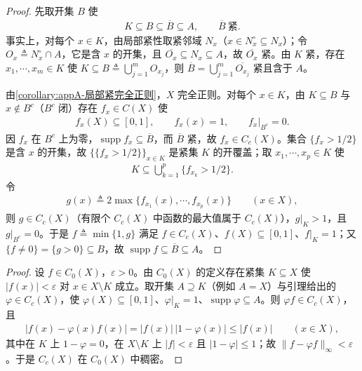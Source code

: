 \documentclass[../main.tex]{subfiles}
\begin{document}
\begin{proof}
先取开集 $B$ 使
\begin{align*}
K\subseteq B\subseteq\overline B\subseteq A,\qquad \overline B\ \text{紧}.
\end{align*}
事实上，对每个 $x\in K$，由局部紧性取紧邻域 $N_x$（$x\in N_x^\circ\subseteq N_x$）；令 $O_x\triangleq N_x^\circ\cap A$，它是含 $x$ 的开集，且 $\overline{O_x}\subseteq N_x\subseteq A$，故 $\overline{O_x}$ 紧。由 $K$ 紧，存在 $x_1,\cdots ,x_m\in K$ 使 $K\subseteq B\triangleq\bigcup_{j=1}^mO_{x_j}$，则 $\overline B=\bigcup_{j=1}^m\overline{O_{x_j}}$ 紧且含于 $A$。

由\cref{corollary:appA-局部紧完全正则}，$X$ 完全正则。对每个 $x\in K$，由 $K\subseteq B$ 与 $x\notin B^c$（$B^c$ 闭）存在 $f_x\in C(X)$ 使
\begin{align*}
f_x(X)\subseteq[0,1],\qquad f_x(x)=1,\qquad f_x|_{B^c}=0.
\end{align*}
因 $f_x$ 在 $B^c$ 上为零，$\operatorname{supp}f_x\subseteq\overline B$，而 $\overline B$ 紧，故 $f_x\in C_c(X)$。集合 $\{f_x>1/2\}$ 是含 $x$ 的开集，故 $\{\{f_x>1/2\}\}_{x\in K}$ 是紧集 $K$ 的开覆盖；取 $x_1,\cdots ,x_p\in K$ 使
\begin{align*}
K\subseteq\bigcup_{k=1}^p\{f_{x_k}>1/2\}.
\end{align*}
令
\begin{align*}
g(x)\triangleq2\max\{f_{x_1}(x),\cdots ,f_{x_p}(x)\}\qquad(x\in X),
\end{align*}
则 $g\in C_c(X)$（有限个 $C_c(X)$ 中函数的最大值属于 $C_c(X)$），$g|_K>1$，且 $g|_{B^c}=0$。于是 $f\triangleq\min\{1,g\}$ 满足 $f\in C_c(X)$、$f(X)\subseteq[0,1]$、$f|_K=1$；又 $\{f\neq0\}=\{g>0\}\subseteq B$，故 $\operatorname{supp}f\subseteq\overline B\subseteq A$。
\end{proof}

\begin{proof}
设 $f\in C_0(X)$，$\varepsilon>0$。由 $C_0(X)$ 的定义存在紧集 $K\subseteq X$ 使 $|f(x)|<\varepsilon$ 对 $x\in X\setminus K$ 成立。取开集 $A\supseteq K$（例如 $A=X$）与引理给出的 $\varphi\in C_c(X)$，使 $\varphi(X)\subseteq[0,1]$、$\varphi|_K=1$、$\operatorname{supp}\varphi\subseteq A$。则 $\varphi f\in C_c(X)$，且
\begin{align*}
|f(x)-\varphi(x)f(x)|=|f(x)|\,|1-\varphi(x)|\leqslant|f(x)|\qquad(x\in X),
\end{align*}
其中在 $K$ 上 $1-\varphi=0$，在 $X\setminus K$ 上 $|f|<\varepsilon$ 且 $|1-\varphi|\leqslant1$；故 $\|f-\varphi f\|_\infty<\varepsilon$。于是 $C_c(X)$ 在 $C_0(X)$ 中稠密。
\end{proof}
\end{document}
